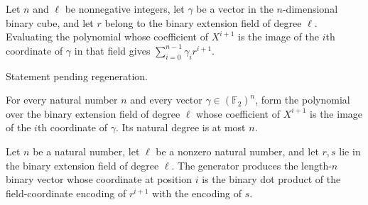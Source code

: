 \begin{theorem}
\label{FABL.smallBiasPolynomial_eval}
\leanok
{}
Let $n$ and $\ell$ be nonnegative integers, let $\gamma$ be a vector in the
$n$-dimensional binary cube, and let $r$ belong to the binary extension field of degree
$\ell$. Evaluating the polynomial whose coefficient of $X^{i+1}$ is the image of the
$i$th coordinate of $\gamma$ in that field gives
$\sum_{i=0}^{n-1}\gamma_i r^{i+1}$.
\end{theorem}

\begin{theorem}
\label{FABL.smallBiasPolynomial_ne_zero}
\leanok
{}
Statement pending regeneration.
\end{theorem}

\begin{theorem}
\label{FABL.smallBiasPolynomial_natDegree_le}
\leanok
{}
For every natural number $n$ and every vector $\gamma\in(\mathbb{F}_2)^n$, form the
polynomial over the binary extension field of degree $\ell$ whose coefficient of
$X^{i+1}$ is the image of the $i$th coordinate of $\gamma$. Its natural degree is at
most $n$.
\end{theorem}

\begin{definition}
\label{FABL.smallBiasGenerator}
\leanok
{}
Let $n$ be a natural number, let $\ell$ be a nonzero natural number, and let $r,s$ lie
in the binary extension field of degree $\ell$. The generator produces the length-$n$
binary vector whose coordinate at position $i$ is the binary dot product of the
field-coordinate encoding of $r^{i+1}$ with the encoding of $s$.
\end{definition}

